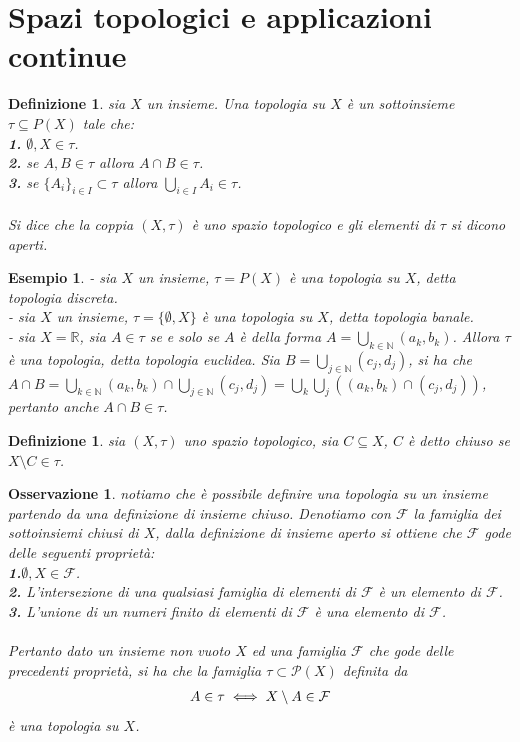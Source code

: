 \documentclass[oneside, 11pt]{amsbook}
\newcommand{\0}{{(0)}}
\newcommand{\3}{{(3)}}
\theoremstyle{colonplain}
\theoremstyle{colondefinition}
\newtheorem{defn}[thm]{Definizione}
\newtheorem{ex}[thm]{Esempio}
\theoremstyle{colonremark}
\newtheorem{rmk}[thm]{Osservazione}
\numberwithin{equation}{chapter}
\begin{document}
\section{Spazi topologici e applicazioni continue}
\begin{defn} sia $X$ un insieme. Una \textit{topologia} su $X$ è un sottoinsieme $\tau \subseteq P(X)$ tale che: \\
\textbf{1.} $\emptyset, X \in \tau$. \\
\textbf{2.} se $A, B \in \tau$ allora $A \cap B \in \tau$. \\
\textbf{3.} se $\{ A_i \}_{i \in I} \subset \tau$ allora $\bigcup_{i \in I} A_i \in \tau$. \\ \\
Si dice che la coppia $(X, \tau)$ è uno \textit{spazio topologico} e gli elementi di $\tau$ si dicono \textit{aperti}.
\end{defn}
\begin{ex} - sia $X$ un insieme, $\tau = P(X)$ è una topologia su $X$, detta \textit{topologia discreta}. \\
- sia $X$ un insieme, $\tau = \{ \emptyset, X \}$ è una topologia su $X$, detta \textit{topologia banale}. \\
- sia $X = \mathbb{R}$, sia $A \in \tau$ se e solo se $A$ è della forma $A = \bigcup_{k \in \mathbb{N}} (a_k, b_k)$. Allora $\tau$ è una topologia, detta \textit{topologia euclidea}. Sia $B = \bigcup_{j \in \mathbb{N}} (c_j, d_j)$, si ha che $A \cap B = \bigcup_{k \in \mathbb{N}} (a_k, b_k) \cap \bigcup_{j \in \mathbb{N}} (c_j, d_j) = \bigcup_k \bigcup_j ((a_k, b_k) \cap (c_j, d_j))$, pertanto anche $A \cap B \in \tau$.
\end{ex}
\begin{defn}
sia $(X, \tau)$ uno spazio topologico, sia $C \subseteq X$, $C$ è detto \textit{chiuso} se $X \setminus C \in \tau$.
\end{defn}
\begin{rmk}
notiamo che è possibile definire una topologia su un insieme partendo da una definizione di insieme chiuso. Denotiamo con $\mathcal{F}$ la famiglia dei sottoinsiemi chiusi di $X$, dalla definizione di insieme aperto si ottiene che $\mathcal{F}$ gode delle seguenti proprietà: \\
\textbf{1.}$\emptyset, X \in \mathcal{F}$. \\
\textbf{2.} L'intersezione di una qualsiasi famiglia di elementi di $\mathcal{F}$ è un elemento di $\mathcal{F}$. \\
\textbf{3.} L'unione di un numeri finito di elementi di $\mathcal{F}$ è una elemento di $\mathcal{F}$. \\ \\
Pertanto dato un insieme non vuoto $X$ ed una famiglia $\mathcal{F}$ che gode delle precedenti proprietà, si ha che la famiglia $\tau \subset \mathcal{P}(X)$ definita da
\begin{align}
    A \in \tau \iff X \setminus A \in \mathcal{F} \notag
\end{align}
è una topologia su $X$.
\end{rmk}
\end{document}
